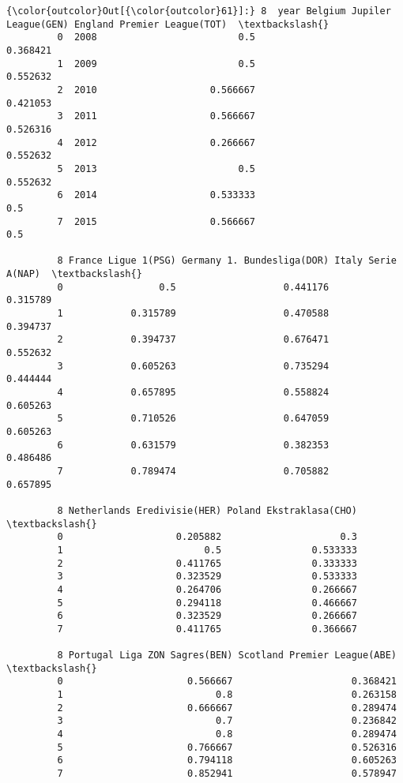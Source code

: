 \documentclass[11pt]{article}
\begin{document}
\begin{Verbatim}[commandchars=\\\{\}]
{\color{outcolor}Out[{\color{outcolor}61}]:} 8  year Belgium Jupiler League(GEN) England Premier League(TOT)  \textbackslash{}
         0  2008                         0.5                    0.368421   
         1  2009                         0.5                    0.552632   
         2  2010                    0.566667                    0.421053   
         3  2011                    0.566667                    0.526316   
         4  2012                    0.266667                    0.552632   
         5  2013                         0.5                    0.552632   
         6  2014                    0.533333                         0.5   
         7  2015                    0.566667                         0.5   
         
         8 France Ligue 1(PSG) Germany 1. Bundesliga(DOR) Italy Serie A(NAP)  \textbackslash{}
         0                 0.5                   0.441176           0.315789   
         1            0.315789                   0.470588           0.394737   
         2            0.394737                   0.676471           0.552632   
         3            0.605263                   0.735294           0.444444   
         4            0.657895                   0.558824           0.605263   
         5            0.710526                   0.647059           0.605263   
         6            0.631579                   0.382353           0.486486   
         7            0.789474                   0.705882           0.657895   
         
         8 Netherlands Eredivisie(HER) Poland Ekstraklasa(CHO)  \textbackslash{}
         0                    0.205882                     0.3   
         1                         0.5                0.533333   
         2                    0.411765                0.333333   
         3                    0.323529                0.533333   
         4                    0.264706                0.266667   
         5                    0.294118                0.466667   
         6                    0.323529                0.266667   
         7                    0.411765                0.366667   
         
         8 Portugal Liga ZON Sagres(BEN) Scotland Premier League(ABE)  \textbackslash{}
         0                      0.566667                     0.368421   
         1                           0.8                     0.263158   
         2                      0.666667                     0.289474   
         3                           0.7                     0.236842   
         4                           0.8                     0.289474   
         5                      0.766667                     0.526316   
         6                      0.794118                     0.605263   
         7                      0.852941                     0.578947   
         

\end{Verbatim}
\end{document}
